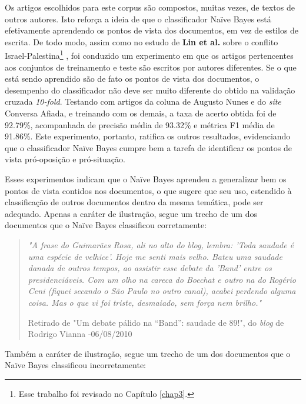 Os artigos escolhidos para este corpus são compostos, muitas vezes, de textos de outros autores. Isto reforça a ideia de que o classificador Naïve Bayes está efetivamente aprendendo os pontos de vista dos documentos, em vez de estilos de escrita. De todo modo, assim como no estudo de \textbf{Lin et al.} sobre o conflito Israel-Palestina\footnote{Esse trabalho foi revisado no Capítulo \ref{chap3}.} \cite{lin-et-al2006}, foi conduzido um experimento em que os artigos pertencentes aos conjuntos de treinamento e teste são escritos por autores diferentes. Se o que está sendo aprendido são de fato os pontos de vista dos documentos, o desempenho do classificador não deve ser muito diferente do obtido na validação cruzada \emph{10-fold}. Testando com artigos da coluna de Augusto Nunes e do \emph{site} Conversa Afiada, e treinando com os demais, a taxa de acerto obtida foi de 92.79\%, acompanhada de precisão média de 93.32\% e métrica F1 média de 91.86\%. Este experimento, portanto, ratifica os outros resultados, evidenciando que o classificador Naïve Bayes cumpre bem a tarefa de identificar os pontos de vista pró-oposição e pró-situação.

Esses experimentos indicam que o Naïve Bayes aprendeu a generalizar bem os pontos de vista contidos nos documentos, o que sugere que seu uso, estendido à classificação de outros documentos dentro da mesma temática, pode ser adequado. Apenas a caráter de ilustração, segue um trecho de um dos documentos  que o Naïve Bayes classificou corretamente:

\begin{quote}

\emph{"A frase do Guimarães Rosa, ali no alto do blog, lembra: 'Toda saudade é uma espécie de velhice'. Hoje me senti mais velho. Bateu uma saudade danada de outros tempos, ao assistir esse debate da 'Band' entre os presidenciáveis. Com um olho na careca do Boechat e outro na do Rogério Ceni (fiquei secando o São Paulo no outro canal), acabei perdendo alguma coisa. Mas o que vi foi triste, desmaiado, sem força nem brilho."}

{\small Retirado de "Um debate pálido na “Band”: saudade de 89!", do \emph{blog} de Rodrigo Vianna -06/08/2010}
\end{quote}

Também a caráter de ilustração, segue um trecho de um dos documentos que o Naïve Bayes classificou incorretamente:

